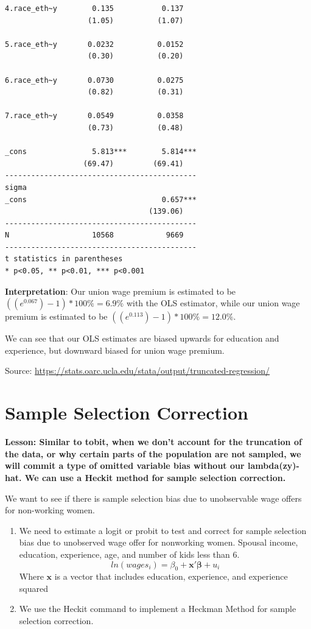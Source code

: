 \documentclass[
]{book}
\begin{document}
\begin{verbatim}
4.race_eth~y        0.135           0.137   
                   (1.05)          (1.07)   

5.race_eth~y       0.0232          0.0152   
                   (0.30)          (0.20)   

6.race_eth~y       0.0730          0.0275   
                   (0.82)          (0.31)   

7.race_eth~y       0.0549          0.0358   
                   (0.73)          (0.48)   

_cons               5.813***        5.814***
                  (69.47)         (69.41)   
--------------------------------------------
sigma                                       
_cons                               0.657***
                                 (139.06)   
--------------------------------------------
N                   10568            9669   
--------------------------------------------
t statistics in parentheses
* p<0.05, ** p<0.01, *** p<0.001
\end{verbatim}

\textbf{Interpretation}: Our union wage premium is estimated to be \(((e^{0.067})-1)*100\% = 6.9\%\) with the OLS estimator, while our union wage premium is estimated to be
\(((e^{0.113})-1)*100\% = 12.0\%\).

We can see that our OLS estimates are biased upwards for education and experience, but downward biased for union wage premium.

Source: \url{https://stats.oarc.ucla.edu/stata/output/truncated-regression/}

\chapter{Sample Selection Correction}\label{sample-selection-correction}

\textbf{Lesson: Similar to tobit, when we don't account for the truncation of the data, or why certain parts of the population are not sampled, we will commit a type of omitted variable bias without our lambda(zy)-hat. We can use a Heckit method for sample selection correction.}

We want to see if there is sample selection bias due to unobservable wage offers
for non-working women.

\begin{enumerate}
\def\labelenumi{\arabic{enumi}.}
\item
  We need to estimate a logit or probit to test and correct for sample selection bias due to unobserved wage offer for nonworking women. Spousal income, education, experience, age, and number of kids less than 6.
  \[ ln(wages_{i})=\beta_{0}+ \mathbf{x'\beta} + u_{i} \]
  Where \(\mathbf{x}\) is a vector that includes education, experience, and experience squared
\item
  We use the Heckit command to implement a Heckman Method for sample selection correction.
\end{enumerate}
\end{document}
